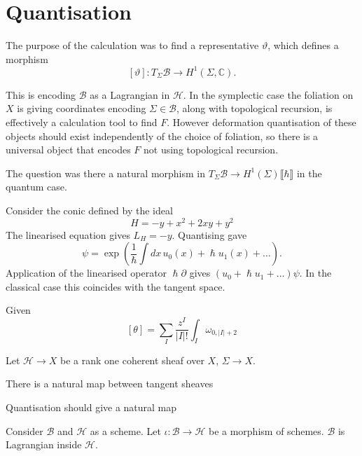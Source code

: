 \section{Quantisation}

The purpose of the calculation was to find a representative \( \vartheta\), which defines a morphism
\[ [\vartheta] : T_\Sigma \mathcal{B} \rightarrow H^1(\Sigma,\mathbb{C}).\]

This is encoding \( \mathcal{B}\) as a Lagrangian in \( \mathcal{H}\). In the symplectic case \cite{} the foliation on \(X\) is giving coordinates encoding \( \Sigma \in \mathcal{B}\), along with topological recursion, is effectively a calculation tool to find \(F\). However deformation quantisation of these objects should exist independently of the choice of foliation, so there is a universal object that encodes \(F\) not using topological recursion.

The question was there a natural morphism in \( T_\Sigma \mathcal{B} \rightarrow H^1(\Sigma)\lBrack \hbar \rBrack \) in the quantum case.

\begin{ex}
Consider the conic defined by the ideal
\[ H = -y + x^2 + 2 x y + y^2 \]
The linearised equation gives \( L_H  = -y \). Quantising gave 
\[ \psi = \exp\left( \frac{1}{\hslash} \int dx \,  u_0(x) + \hslash u_1(x) + \dots \right).\]
Application of the linearised operator \(  \hslash \partial \) gives 
\( ( u_0 + \hslash u_1 + \dots ) \psi \). In the classical case this coincides with the tangent space.
\end{ex}




Given
\[ [\theta] = \sum_{I} \frac{z^{I}}{\vert I \vert! } \int_{I} \omega_{0,\vert I\vert +2} \]


Let \( \mathcal{H} \rightarrow X\) be a rank one coherent sheaf over \( X\), \( \Sigma \rightarrow X\). 


There is a natural map between tangent sheaves
\begin{center}
\end{center}
Quantisation should give a natural map 
\begin{center}
\end{center}



\newpage 

Consider  \( \mathcal{B}\) and \( \mathcal{H}\) as a scheme. Let \( \iota : \mathcal{B} \rightarrow \mathcal{H} \) be a morphism of schemes. \( \mathcal{B}\) is Lagrangian inside \( \mathcal{H}\).